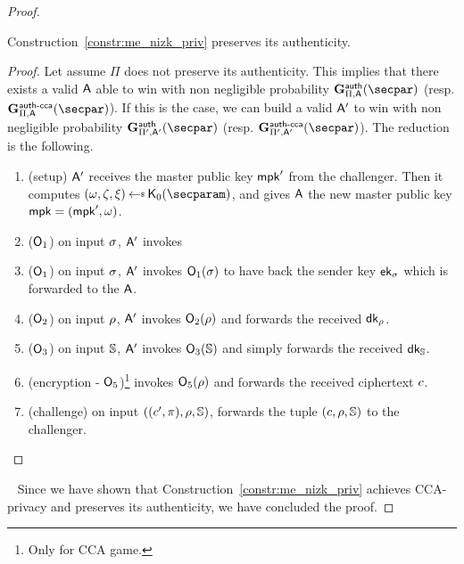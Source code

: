 \begin{proof}
    \begin{lemma}\label{lemma:me_auth_same}
        Construction~\ref{constr:me_nizk_priv} preserves its authenticity.
        \begin{proof}
            Let assume $\Pi$ does not preserve its authenticity.
            This implies that there exists a valid $\mathsf{A}$ able to win with non negligible probability $\NISHeufgame{}_{\Pi, \adversary}(\secpar)$ (resp. $\NISHeufgamecca{}_{\Pi, \adversary}(\secpar)$).
            If this is the case, we can build a valid $\mathsf{A}'$ to win with non negligible probability $\NISHeufgame{}_{\Pi', \adversary'}(\secpar)$ (resp. $\NISHeufgamecca{}_{\Pi', \adversary'}(\secpar)$).
            The reduction is the following.

            \begin{enumerate}
                \item (setup) $\mathsf{A}'$ receives the master public key $\mathsf{mpk}'$ from the challenger. Then it computes $(\crs,\tpsim,\tpext)\getsr\nizkext_0(\secparam)$, and gives $\mathsf{A}$ the new master public key $\mathsf{mpk} = (\mathsf{mpk}', \omega)$.
                \item ($\mathsf{O}_1$) on input $\sigma$, $\mathsf{A}'$ invokes \item ($\mathsf{O}_1$) on input $\sigma$, $\mathsf{A}'$ invokes $\mathsf{O}_1(\sigma)$ to have back the sender key $\mathsf{ek}_\sigma$ which is forwarded to the $\mathsf{A}$.
                \item ($\mathsf{O}_2$) on input $\rho$, $\mathsf{A}'$ invokes $\mathsf{O}_2(\rho)$ and forwards the received $\mathsf{dk}_\rho$.
                \item ($\mathsf{O}_3$) on input $\mathbb{S}$, $\mathsf{A}'$ invokes $\mathsf{O}_3(\mathbb{S})$ and simply forwards the received $\mathsf{dk}_{\mathbb{S}}$.
                \item (encryption - $\mathsf{O}_5$)\footnote{Only for CCA game.} invokes $\mathsf{O}_5(\rho)$ and forwards the received ciphertext $c$.
                \item (challenge) on input $((c', \pi), \rho, \mathbb{S})$, forwards the tuple $(c, \rho, \mathbb{S})$ to the challenger.
            \end{enumerate}
        \end{proof}
    \end{lemma}
    ~\newline
    Since we have shown that Construction~\ref{constr:me_nizk_priv} achieves CCA-privacy and preserves its authenticity, we have concluded the proof.
\end{proof}

